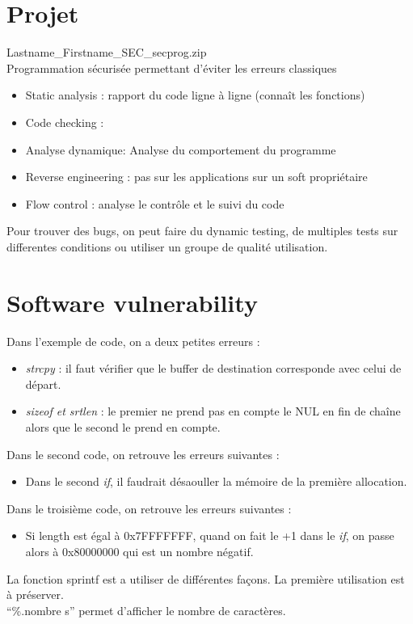 \section{Projet}
Lastname\_Firstname\_SEC\_secprog.zip\\
Programmation sécurisée permettant d'éviter les erreurs classiques
\begin{itemize}
 \item Static analysis : rapport du code ligne à ligne (connaît les fonctions)
 \item Code checking : 
 \item Analyse dynamique: Analyse du comportement du programme
 \item Reverse engineering : pas sur les applications sur un soft propriétaire
 \item Flow control : analyse le contrôle et le suivi du code
\end{itemize}
Pour trouver des bugs, on peut faire du dynamic testing, de multiples tests sur differentes conditions ou utiliser un groupe de qualité utilisation.\\

\section{Software vulnerability}

Dans l'exemple de code, on a deux petites erreurs :
\begin{itemize}
 \item \textit{strcpy} : il faut vérifier que le buffer de destination corresponde avec celui de départ.
 \item \textit{sizeof et srtlen} : le premier ne prend pas en compte le NUL en fin de chaîne alors que le second le prend en compte.
\end{itemize}
Dans le second code, on retrouve les erreurs suivantes :
\begin{itemize}
 \item Dans le second \textit{if}, il faudrait désaouller la mémoire de la première allocation.
\end{itemize}
Dans le troisième code, on retrouve les erreurs suivantes :
\begin{itemize}
 \item Si length est égal à 0x7FFFFFFF, quand on fait le +1 dans le \textit{if}, on passe alors à 0x80000000 qui est un nombre négatif.
\end{itemize}
La fonction sprintf est a utiliser de différentes façons. La première utilisation est à préserver.\\
\enquote{\%.nombre s} permet d'afficher le nombre de caractères.

